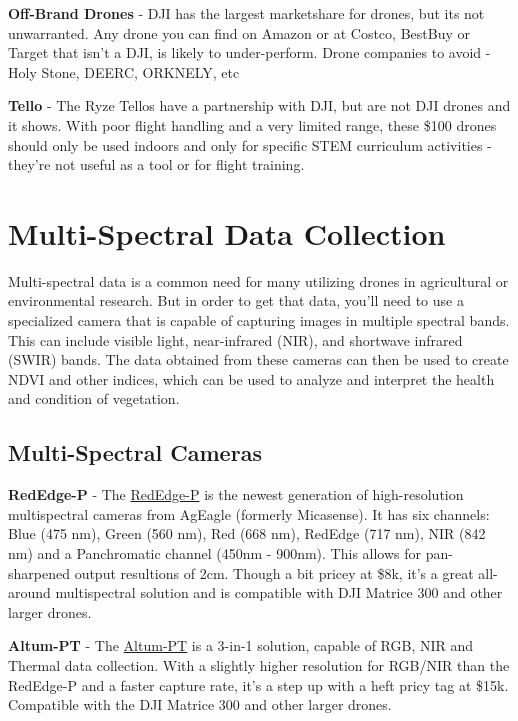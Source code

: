 \documentclass[
  12pt,
]{book}
\begin{document}
\textbf{Off-Brand Drones} - DJI has the largest marketshare for drones, but its not unwarranted. Any drone you can find on Amazon or at Costco, BestBuy or Target that isn't a DJI, is likely to under-perform. Drone companies to avoid - Holy Stone, DEERC, ORKNELY, etc

\textbf{Tello} - The Ryze Tellos have a partnership with DJI, but are not DJI drones and it shows. With poor flight handling and a very limited range, these \$100 drones should only be used indoors and only for specific STEM curriculum activities - they're not useful as a tool or for flight training.

\section{Multi-Spectral Data Collection}\label{multi-spectral-data-collection}

Multi-spectral data is a common need for many utilizing drones in agricultural or environmental research. But in order to get that data, you'll need to use a specialized camera that is capable of capturing images in multiple spectral bands. This can include visible light, near-infrared (NIR), and shortwave infrared (SWIR) bands. The data obtained from these cameras can then be used to create NDVI and other indices, which can be used to analyze and interpret the health and condition of vegetation.

\subsection{Multi-Spectral Cameras}\label{multi-spectral-cameras}

\textbf{RedEdge-P} - The \href{https://ageagle.com/drone-sensors/rededge-p/}{RedEdge-P} is the newest generation of high-resolution multispectral cameras from AgEagle (formerly Micasense). It has six channels: Blue (475 nm), Green (560 nm), Red (668 nm), RedEdge (717 nm), NIR (842 nm) and a Panchromatic channel (450nm - 900nm). This allows for pan-sharpened output resultions of 2cm. Though a bit pricey at \$8k, it's a great all-around multispectral solution and is compatible with DJI Matrice 300 and other larger drones.

\textbf{Altum-PT} - The \href{https://ageagle.com/drone-sensors/altum-pt/}{Altum-PT} is a 3-in-1 solution, capable of RGB, NIR and Thermal data collection. With a slightly higher resolution for RGB/NIR than the RedEdge-P and a faster capture rate, it's a step up with a heft pricy tag at \$15k. Compatible with the DJI Matrice 300 and other larger drones.
\end{document}
